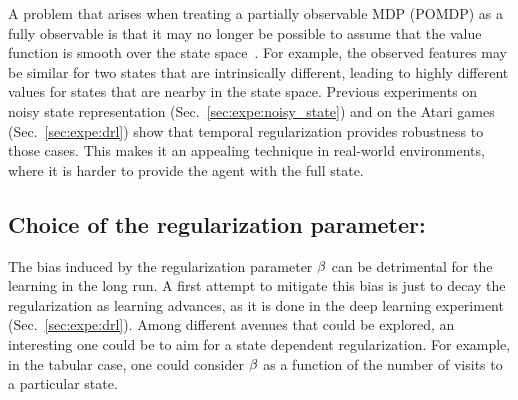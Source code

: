 A problem that arises when treating a partially observable MDP (POMDP) as a fully observable is that it may no longer be possible to assume that the value function is smooth over the state space~\citep{singh1994learning}.
For example, the observed features may be similar for two states that are intrinsically different, leading to highly different values for states that are nearby in the state space. Previous experiments on noisy state representation (Sec.~\ref{sec:expe:noisy_state}) and on the Atari games (Sec.~\ref{sec:expe:drl}) show that temporal regularization provides robustness to those cases. This makes it an appealing technique in real-world environments, where it is harder to provide the agent with the full state.
\subsection{Choice of the regularization parameter:}

The bias induced by the regularization parameter $\beta$ can be detrimental for the learning in the long run. A first attempt to mitigate this bias is just to decay the regularization as learning advances, as it is done in the deep learning experiment (Sec.~\ref{sec:expe:drl}). Among different avenues that could be explored, an interesting one could be to aim for a state dependent regularization. For example, in the tabular case, one could consider $\beta$ as a function of the number of visits to a particular state.
